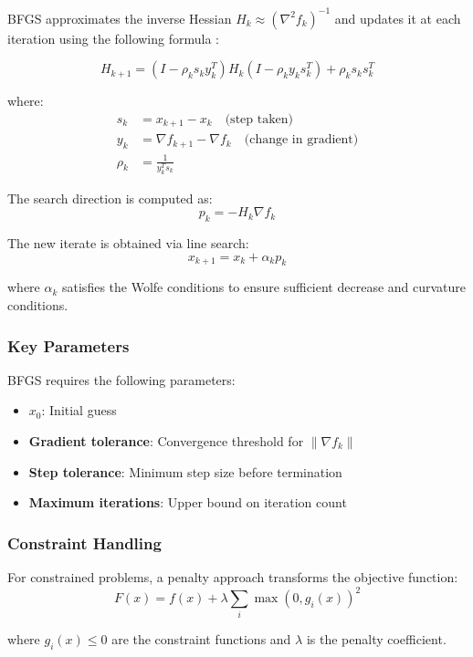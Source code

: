 BFGS approximates the inverse Hessian $H_k \approx (\nabla^2 f_k)^{-1}$ and updates it at each iteration using the following formula \cite{task4_chenonceau}:

\begin{equation}
H_{k+1} = (I - \rho_k s_k y_k^T) H_k (I - \rho_k y_k s_k^T) + \rho_k s_k s_k^T
\end{equation}

where:
\begin{align}
s_k &= x_{k+1} - x_k \quad \text{(step taken)} \\
y_k &= \nabla f_{k+1} - \nabla f_k \quad \text{(change in gradient)} \\
\rho_k &= \frac{1}{y_k^T s_k}
\end{align}

The search direction is computed as:
\begin{equation}
p_k = -H_k \nabla f_k
\end{equation}

The new iterate is obtained via line search:
\begin{equation}
x_{k+1} = x_k + \alpha_k p_k
\end{equation}

where $\alpha_k$ satisfies the Wolfe conditions to ensure sufficient decrease and curvature conditions.

\subsubsection{Key Parameters}

BFGS requires the following parameters:
\begin{itemize}
    \item \textbf{$x_0$}: Initial guess
    \item \textbf{Gradient tolerance}: Convergence threshold for $\|\nabla f_k\|$
    \item \textbf{Step tolerance}: Minimum step size before termination
    \item \textbf{Maximum iterations}: Upper bound on iteration count
\end{itemize}

\subsubsection{Constraint Handling}

For constrained problems, a penalty approach transforms the objective function:
\begin{equation}
F(x) = f(x) + \lambda \sum_{i} \max(0, g_i(x))^2
\end{equation}

where $g_i(x) \leq 0$ are the constraint functions and $\lambda$ is the penalty coefficient.